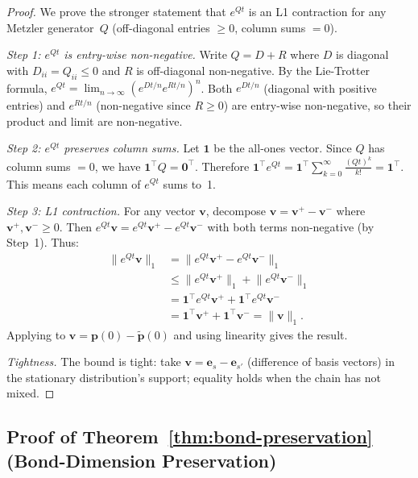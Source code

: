 \documentclass[11pt]{article}
\newcommand{\norm}[1]{\lVert #1 \rVert}
\begin{document}
\begin{proof}
We prove the stronger statement that $e^{Qt}$ is an L1 contraction
for any Metzler generator~$Q$ (off-diagonal entries $\geq 0$,
column sums $= 0$).

\emph{Step 1: $e^{Qt}$ is entry-wise non-negative.}
Write $Q = D + R$ where $D$ is diagonal with $D_{ii} = Q_{ii} \leq 0$
and $R$ is off-diagonal non-negative.
By the Lie-Trotter formula,
$e^{Qt} = \lim_{n\to\infty}(e^{Dt/n}e^{Rt/n})^n$.
Both $e^{Dt/n}$ (diagonal with positive entries) and $e^{Rt/n}$
(non-negative since $R \geq 0$) are entry-wise non-negative,
so their product and limit are non-negative.

\emph{Step 2: $e^{Qt}$ preserves column sums.}
Let $\mathbf{1}$ be the all-ones vector.
Since $Q$ has column sums $= 0$, we have $\mathbf{1}^\top Q = \mathbf{0}^\top$.
Therefore $\mathbf{1}^\top e^{Qt} = \mathbf{1}^\top \sum_{k=0}^{\infty}
\frac{(Qt)^k}{k!} = \mathbf{1}^\top$.
This means each column of $e^{Qt}$ sums to~1.

\emph{Step 3: L1 contraction.}
For any vector $\mathbf{v}$, decompose $\mathbf{v} = \mathbf{v}^+ - \mathbf{v}^-$
where $\mathbf{v}^+, \mathbf{v}^- \geq 0$.
Then $e^{Qt}\mathbf{v} = e^{Qt}\mathbf{v}^+ - e^{Qt}\mathbf{v}^-$
with both terms non-negative (by Step~1).
Thus:
\begin{align}
  \norm{e^{Qt}\mathbf{v}}_1
  &= \norm{e^{Qt}\mathbf{v}^+ - e^{Qt}\mathbf{v}^-}_1 \nonumber\\
  &\leq \norm{e^{Qt}\mathbf{v}^+}_1 + \norm{e^{Qt}\mathbf{v}^-}_1 \nonumber\\
  &= \mathbf{1}^\top e^{Qt}\mathbf{v}^+ + \mathbf{1}^\top e^{Qt}\mathbf{v}^- \nonumber\\
  &= \mathbf{1}^\top\mathbf{v}^+ + \mathbf{1}^\top\mathbf{v}^-
  = \norm{\mathbf{v}}_1.
\end{align}
Applying to $\mathbf{v} = \mathbf{p}(0) - \tilde{\mathbf{p}}(0)$
and using linearity gives the result.

\emph{Tightness.}
The bound is tight: take $\mathbf{v} = \mathbf{e}_s - \mathbf{e}_{s'}$
(difference of basis vectors) in the stationary distribution's
support; equality holds when the chain has not mixed.
\end{proof}

\subsection{Proof of Theorem~\ref{thm:bond-preservation}
  (Bond-Dimension Preservation)}
\end{document}
